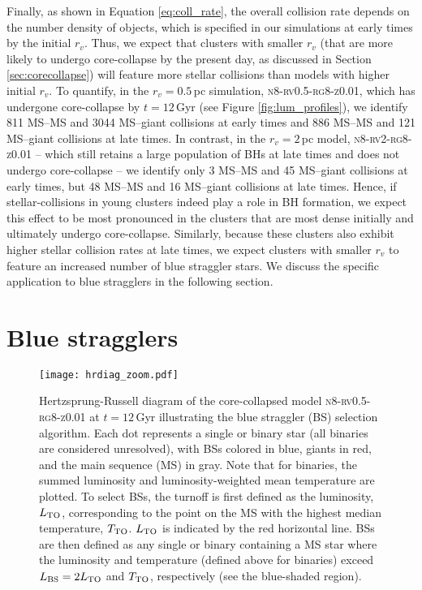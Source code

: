 \documentclass[twocolumn,tighten]{aastex63}
\begin{document}
Finally, as shown in Equation \ref{eq:coll_rate}, the overall collision rate depends on the number density of objects, which is specified in our simulations at early times by the initial $r_v$.  Thus, we expect that clusters with smaller $r_v$ (that are more likely to undergo core-collapse by the present day, as discussed in Section \ref{sec:corecollapse}) will feature more stellar collisions than models with higher initial $r_v$.
To quantify, in the $r_v=0.5\,$pc simulation, \textsc{n8-rv0.5-rg8-z0.01}, which has undergone core-collapse by $t=12\,$Gyr (see Figure \ref{fig:lum_profiles}), we identify 811 MS--MS and 3044 MS--giant collisions at early times and 886 MS--MS and 121 MS--giant collisions at late times. In contrast, in the $r_v=2\,$pc model, \textsc{n8-rv2-rg8-z0.01} -- which still retains a large population of BHs at late times and does not undergo core-collapse -- we identify only 3 MS--MS and 45 MS--giant collisions at early times, but 48 MS--MS and 16 MS--giant collisions at late times. Hence, if stellar-collisions in young clusters indeed play a role in BH formation, we expect this effect to be most pronounced in the clusters that are most dense initially and ultimately undergo core-collapse. Similarly, because these clusters also exhibit higher stellar collision rates at late times, we expect clusters with smaller $r_v$ to feature an increased number of blue straggler stars. We discuss the specific application to blue stragglers in the following section.

\section{Blue stragglers}
\label{sec:BSs}

\begin{figure}
\texttt{[image: hrdiag\_zoom.pdf]}
\caption{\footnotesize Hertzsprung-Russell diagram of the core-collapsed model \textsc{n8-rv0.5-rg8-z0.01} at $t=12\,$Gyr illustrating the blue straggler (BS) selection algorithm. Each dot represents a single or binary star (all binaries are considered unresolved), with BSs colored in blue, giants in red, and the main sequence (MS) in gray. Note that for binaries, the summed luminosity and luminosity-weighted mean temperature are plotted. To select BSs, the turnoff is first defined as the luminosity, $L_{\rm{TO}}$, corresponding to the point on the MS with the highest median temperature, $T_{\rm{TO}}$. $L_{\rm{TO}}$ is indicated by the red horizontal line. BSs are then defined as any single or binary containing a MS star where the luminosity and temperature (defined above for binaries) exceed $L_{\rm{BS}} = 2 L_{\rm{TO}}$ and $T_{\rm{TO}}$, respectively (see the blue-shaded region).}
\label{fig:hrdiag_zoom}
\end{figure}
\end{document}
